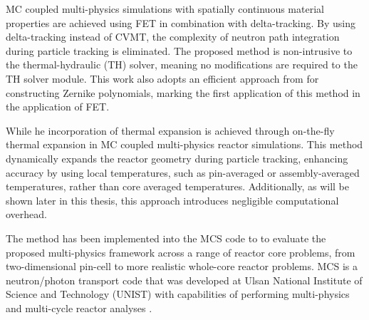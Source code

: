 MC coupled multi-physics simulations with spatially continuous material properties are achieved using FET in combination with delta-tracking. By using delta-tracking instead of CVMT, the complexity of neutron path integration during particle tracking is eliminated. The proposed method is non-intrusive to the thermal-hydraulic (TH) solver, meaning no modifications are required to the TH solver module. This work also adopts an efficient approach from \cite{honarvar} for constructing Zernike polynomials, marking the first application of this method in the application of FET.

While he incorporation of thermal expansion is achieved through on-the-fly thermal expansion in MC coupled multi-physics reactor simulations. This method dynamically expands the reactor geometry during particle tracking, enhancing accuracy by using local temperatures, such as pin-averaged or assembly-averaged temperatures, rather than core averaged temperatures. Additionally, as will be shown later in this thesis, this approach introduces negligible computational overhead.

The method has been implemented into the MCS code \cite{hlee_2020} to to evaluate the proposed multi-physics framework across a range of reactor core problems, from two-dimensional pin-cell to more realistic whole-core reactor problems. MCS is a neutron/photon transport code that was developed at Ulsan National Institute of Science and Technology (UNIST) with capabilities of performing multi-physics and multi-cycle reactor analyses \cite{hlee_2017,yu_2019,yu_2020}.